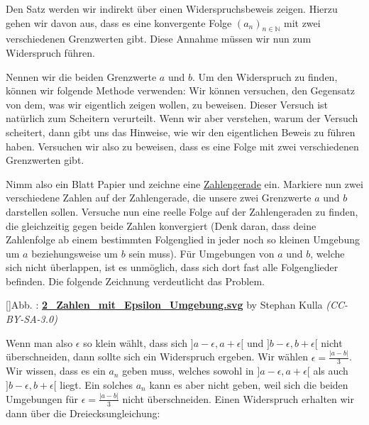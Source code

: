 \documentclass[fontsize=9pt,
               parskip=half-,
               DIV=14,
               listof=chapterentry,
               tocflat]{scrbook}
\newcounter{imagelabel}
\begin{document}
\begin{solutionprocess*}
Den Satz werden wir indirekt über einen Widerspruchsbeweis zeigen. Hierzu gehen wir davon aus, dass es eine konvergente Folge $\left(a_{n}\right)_{n\in \mathbb {N} }$ mit zwei verschiedenen Grenzwerten gibt. Diese Annahme müssen wir nun zum Widerspruch führen.

Nennen wir die beiden Grenzwerte $a$ und $b$. Um den Widerspruch zu finden, können wir folgende Methode verwenden: Wir können versuchen, den Gegensatz von dem, was wir eigentlich zeigen wollen, zu beweisen. Dieser Versuch ist natürlich zum Scheitern verurteilt. Wenn wir aber verstehen, warum der Versuch scheitert, dann gibt uns das Hinweise, wie wir den eigentlichen Beweis zu führen haben. Versuchen wir also zu beweisen, dass es eine Folge mit zwei verschiedenen Grenzwerten gibt.

Nimm also ein Blatt Papier und zeichne eine \href{https://de.wikibooks.org/wiki/Mathe\_für\_Nicht-Freaks:\_Zahlengerade}
{Zahlengerade} ein. Markiere nun zwei verschiedene Zahlen auf der Zahlengerade, die unsere zwei Grenzwerte $a$ und $b$ darstellen sollen. Versuche nun eine reelle Folge auf der Zahlengeraden zu finden, die gleichzeitig gegen beide Zahlen konvergiert (Denk daran, dass deine Zahlenfolge ab einem bestimmten Folgenglied in jeder noch so kleinen Umgebung um $a$ beziehungsweise um $b$ sein muss). Für Umgebungen von $a$ und $b$, welche sich nicht überlappen, ist es unmöglich, dass sich dort fast alle Folgenglieder befinden. Die folgende Zeichnung verdeutlicht das Problem.

[]{Abb. : \protect\href{https://commons.wikimedia.org/wiki/File:2_Zahlen_mit_Epsilon_Umgebung.svg}{\textbf{2\allowbreak\_Zahlen\allowbreak\_mit\allowbreak\_Epsilon\allowbreak\_Umgebung.svg}} by Stephan Kulla \textit{(CC-BY-SA-3.0)}}\begin{center}
\end{center}

Wenn man also $\epsilon $ so klein wählt, dass sich $]a-\epsilon ,a+\epsilon [$ und $]b-\epsilon ,b+\epsilon [$ nicht überschneiden, dann sollte sich ein Widerspruch ergeben. Wir wählen $\epsilon ={\tfrac {|a-b|}{3}}$. Wir wissen, dass es ein $a_{n}$ geben muss, welches sowohl in $]a-\epsilon ,a+\epsilon [$ als auch $]b-\epsilon ,b+\epsilon [$ liegt. Ein solches $a_{n}$ kann es aber nicht geben, weil sich die beiden Umgebungen für $\epsilon ={\tfrac {|a-b|}{3}}$ nicht überschneiden. Einen Widerspruch erhalten wir dann über die Dreiecksungleichung:


\end{solutionprocess*}
\end{document}
